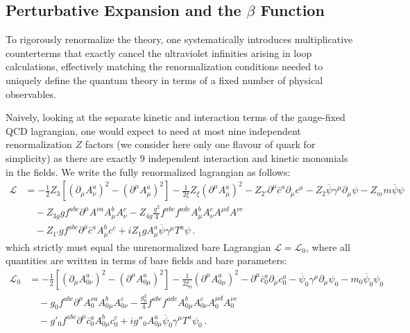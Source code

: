 \subsection{Perturbative Expansion and the $\beta$ Function}

To rigorously renormalize the theory, one systematically introduces multiplicative counterterms that exactly cancel the ultraviolet infinities arising in loop calculations, effectively matching the renormalization conditions needed to uniquely define the quantum theory in terms of a fixed number of physical observables.

Naively, looking at the separate kinetic and interaction terms of the gauge-fixed QCD lagrangian, one would expect to need at most nine independent renormalization $Z$ factors (we consider here only one flavour of quark for simplicity) as there are exactly 9 independent interaction and kinetic monomials in the fields. We write the fully renormalized lagrangian as follows:
\begin{equation} \label{eq:renormalized_lagrangian}
    \begin{aligned}
        \mathcal{L} & = -\frac{1}{2}Z_3[(\partial_\mu A_\nu^a)^2 - (\partial^\mu A_\mu^a)^2] - \frac{1}{2\xi}Z_\xi(\partial^\mu A_\mu^a)^2 - Z_{2'}\partial^\mu \bar{c}^a \partial_\mu c^a - Z_2 \overline{\psi}\gamma^\mu\partial_\mu\psi - Z_m m\overline{\psi}\psi \\
                    & \quad - Z_{3g} g f^{abc} \partial^\mu A^{\nu a} A_\mu^b A_\nu^c - Z_{4g}\frac{g^2}{4}f^{abc} f^{ade} A_\mu^b A_\nu^c A^{\mu d} A^{\nu e}                                                                                                        \\
                    & \quad - Z_{1'} g f^{abc} \partial^\mu \bar{c}^a A_\mu^b c^c + iZ_1 g A_\mu^a \overline{\psi}\gamma^\mu T^a \psi \, .
    \end{aligned}
\end{equation}
which strictly must equal the unrenormalized bare Lagrangian $\mathcal{L} = \mathcal{L}_0$, where all quantities are written in terms of bare fields and bare parameters:
\begin{equation} \label{eq:bare_lagrangian}
    \begin{aligned}
        \mathcal{L}_0 & = -\frac{1}{2}[(\partial_\mu A_{0\nu}^a)^2 - (\partial^\mu A_{0\mu}^a)^2] - \frac{1}{2\xi_0}(\partial^\mu A_{0\mu}^a)^2 - \partial^\mu \bar{c}_0^a \partial_\mu c_0^a - \overline{\psi}_0\gamma^\mu\partial_\mu\psi_0 - m_0\overline{\psi}_0\psi_0 \\
                      & \quad - g_0 f^{abc} \partial^\mu A_0^{\nu a} A_{0\mu}^b A_{0\nu}^c - \frac{g_0^2}{4}f^{abc} f^{ade} A_{0\mu}^b A_{0\nu}^c A_0^{\mu d} A_0^{\nu e}                                                                                                  \\
                      & \quad - g'_0 f^{abc} \partial^\mu \bar{c}_0^a A_{0\mu}^b c_0^c + ig''_0 A_{0\mu}^a \overline{\psi}_0\gamma^\mu T^a \psi_0 \, .
    \end{aligned}
\end{equation}

